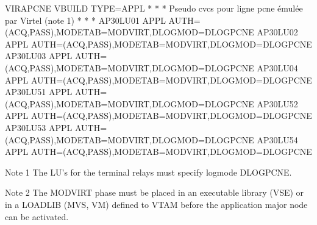 \documentclass[letterpaper,10pt,english]{sphinxmanual}
\begin{document}
\begin{sphinxVerbatim}[commandchars=\\\{\}]
VIRAPCNE VBUILD TYPE=APPL
* \PYGZhy{}\PYGZhy{}\PYGZhy{}\PYGZhy{}\PYGZhy{}\PYGZhy{}\PYGZhy{}\PYGZhy{}\PYGZhy{}\PYGZhy{}\PYGZhy{}\PYGZhy{}\PYGZhy{}\PYGZhy{}\PYGZhy{}\PYGZhy{}\PYGZhy{}\PYGZhy{}\PYGZhy{}\PYGZhy{}\PYGZhy{}\PYGZhy{}\PYGZhy{}\PYGZhy{}\PYGZhy{}\PYGZhy{}\PYGZhy{}\PYGZhy{}\PYGZhy{}\PYGZhy{}\PYGZhy{}\PYGZhy{}\PYGZhy{}\PYGZhy{}\PYGZhy{}\PYGZhy{}\PYGZhy{}\PYGZhy{}\PYGZhy{}\PYGZhy{}\PYGZhy{}\PYGZhy{}\PYGZhy{}\PYGZhy{}\PYGZhy{}\PYGZhy{}\PYGZhy{}\PYGZhy{}\PYGZhy{}\PYGZhy{}\PYGZhy{}\PYGZhy{}\PYGZhy{}\PYGZhy{}\PYGZhy{}\PYGZhy{}\PYGZhy{}\PYGZhy{}\PYGZhy{}\PYGZhy{}\PYGZhy{}\PYGZhy{}\PYGZhy{}\PYGZhy{}\PYGZhy{}\PYGZhy{} *
* Pseudo cvcs pour ligne pcne émulée par Virtel (note 1) *
* \PYGZhy{}\PYGZhy{}\PYGZhy{}\PYGZhy{}\PYGZhy{}\PYGZhy{}\PYGZhy{}\PYGZhy{}\PYGZhy{}\PYGZhy{}\PYGZhy{}\PYGZhy{}\PYGZhy{}\PYGZhy{}\PYGZhy{}\PYGZhy{}\PYGZhy{}\PYGZhy{}\PYGZhy{}\PYGZhy{}\PYGZhy{}\PYGZhy{}\PYGZhy{}\PYGZhy{}\PYGZhy{}\PYGZhy{}\PYGZhy{}\PYGZhy{}\PYGZhy{}\PYGZhy{}\PYGZhy{}\PYGZhy{}\PYGZhy{}\PYGZhy{}\PYGZhy{}\PYGZhy{}\PYGZhy{}\PYGZhy{}\PYGZhy{}\PYGZhy{}\PYGZhy{}\PYGZhy{}\PYGZhy{}\PYGZhy{}\PYGZhy{}\PYGZhy{}\PYGZhy{}\PYGZhy{}\PYGZhy{}\PYGZhy{}\PYGZhy{}\PYGZhy{}\PYGZhy{}\PYGZhy{}\PYGZhy{}\PYGZhy{}\PYGZhy{}\PYGZhy{}\PYGZhy{}\PYGZhy{}\PYGZhy{}\PYGZhy{}\PYGZhy{}\PYGZhy{}\PYGZhy{}\PYGZhy{} *
AP30LU01 APPL AUTH=(ACQ,PASS),MODETAB=MODVIRT,DLOGMOD=DLOGPCNE
AP30LU02 APPL AUTH=(ACQ,PASS),MODETAB=MODVIRT,DLOGMOD=DLOGPCNE
AP30LU03 APPL AUTH=(ACQ,PASS),MODETAB=MODVIRT,DLOGMOD=DLOGPCNE
AP30LU04 APPL AUTH=(ACQ,PASS),MODETAB=MODVIRT,DLOGMOD=DLOGPCNE
AP30LU51 APPL AUTH=(ACQ,PASS),MODETAB=MODVIRT,DLOGMOD=DLOGPCNE
AP30LU52 APPL AUTH=(ACQ,PASS),MODETAB=MODVIRT,DLOGMOD=DLOGPCNE
AP30LU53 APPL AUTH=(ACQ,PASS),MODETAB=MODVIRT,DLOGMOD=DLOGPCNE
AP30LU54 APPL AUTH=(ACQ,PASS),MODETAB=MODVIRT,DLOGMOD=DLOGPCNE

Note 1
    The LU’s for the terminal relays must specify logmode DLOGPCNE.

Note 2
    The MODVIRT phase must be placed in an executable library (VSE) or in a LOADLIB (MVS, VM) defined to VTAM before the application major node can be activated.
\end{sphinxVerbatim}

\ignorespaces 
\end{document}
